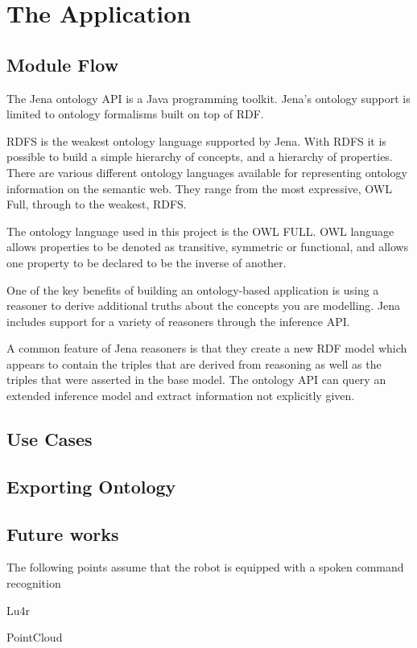 \section{The Application}

\subsection{Module Flow}
The Jena ontology API is a Java programming toolkit. Jena's ontology support is limited to ontology formalisms built on top of RDF.

RDFS is the weakest ontology language supported by Jena. With RDFS it is possible to build a simple hierarchy of concepts, and a hierarchy of properties. 
There are various different ontology languages available for representing ontology information on the semantic web. They range from the most expressive, OWL Full, through to the weakest, RDFS.

The ontology language used in this project is the OWL FULL. OWL language allows properties to be denoted as transitive, symmetric or functional, and allows one property to be declared to be the inverse of another.

One of the key benefits of building an ontology-based application is using a reasoner to derive additional truths about the concepts you are modelling. Jena includes support for a variety of reasoners through the inference API.

A common feature of Jena reasoners is that they create a new RDF model which appears to contain the triples that are derived from reasoning as well as the triples that were asserted in the base model. The ontology API can query an extended inference model and extract information not explicitly given.

\subsection{Use Cases}


\subsection{Exporting Ontology}


\subsection{Future works}

The following points assume that the robot is equipped with a spoken command recognition

Lu4r

PointCloud